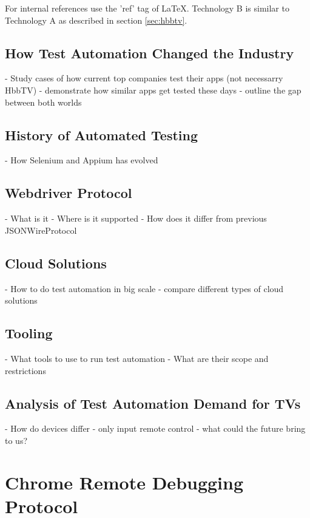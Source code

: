 For internal references use the 'ref' tag of LaTeX. Technology B is similar to Technology A
as described in section \ref{sec:hbbtv}.

\subsection{How Test Automation Changed the Industry\label{sec:howitchanged}}

- Study cases of how current top companies test their apps (not necessarry HbbTV)
- demonstrate how similar apps get tested these days
- outline the gap between both worlds

\subsection{History of Automated Testing\label{sec:history}}

- How Selenium and Appium has evolved

\subsection{Webdriver Protocol\label{sec:webdriver}}

- What is it
- Where is it supported
- How does it differ from previous JSONWireProtocol

\subsection{Cloud Solutions\label{sec:cloud}}

- How to do test automation in big scale
- compare different types of cloud solutions

\subsection{Tooling\label{sec:tooling}}

- What tools to use to run test automation
- What are their scope and restrictions

\subsection{Analysis of Test Automation Demand for TVs\label{sec:testautomationontv}}

- How do devices differ
- only input remote control
- what could the future bring to us?

\section{Chrome Remote Debugging Protocol}

